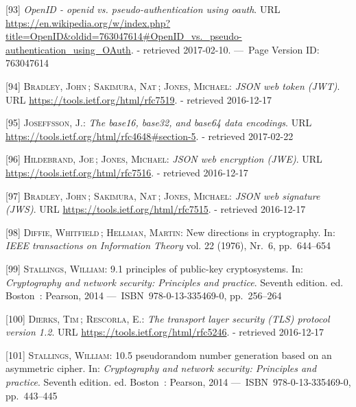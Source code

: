 \documentclass[12pt,english,a4paper,titlepage,cleardoublepage=empty,dottedtoc]{report}
\begin{document}
\hypertarget{ref-web_2017_wikipedia_openid-vs-pseudo-oauth}{}
{[}93{]} \emph{OpenID - openid vs. pseudo-authentication using oauth}.
URL
\url{https://en.wikipedia.org/w/index.php?title=OpenID\&oldid=763047614\#OpenID_vs._pseudo-authentication_using_OAuth}.
- retrieved 2017-02-10. ---~Page Version ID: 763047614

\hypertarget{ref-web_spec_json-web-token}{}
{[}94{]} \textsc{Bradley, John}\,; \textsc{Sakimura, Nat}\,;
\textsc{Jones, Michael}: \emph{JSON web token (JWT)}. URL
\url{https://tools.ietf.org/html/rfc7519}. - retrieved 2016-12-17

\hypertarget{ref-web_spec_base64url}{}
{[}95{]} \textsc{Joseffsson, J.}: \emph{The base16, base32, and base64
data encodings}. URL
\url{https://tools.ietf.org/html/rfc4648\#section-5}. - retrieved
2017-02-22

\hypertarget{ref-web_spec_json-web-encryption}{}
{[}96{]} \textsc{Hildebrand, Joe}\,; \textsc{Jones, Michael}: \emph{JSON
web encryption (JWE)}. URL \url{https://tools.ietf.org/html/rfc7516}. -
retrieved 2016-12-17

\hypertarget{ref-web_spec_json-web-signature}{}
{[}97{]} \textsc{Bradley, John}\,; \textsc{Sakimura, Nat}\,;
\textsc{Jones, Michael}: \emph{JSON web signature (JWS)}. URL
\url{https://tools.ietf.org/html/rfc7515}. - retrieved 2016-12-17

\hypertarget{ref-paper_1976_d-h-key-exchange}{}
{[}98{]} \textsc{Diffie, Whitfield}\,; \textsc{Hellman, Martin}: New
directions in cryptography. In: \emph{IEEE transactions on Information
Theory} vol. 22 (1976), Nr.~6, pp.~644--654

\hypertarget{ref-book_2014_chapter-9-1-public-key-crypto}{}
{[}99{]} \textsc{Stallings, William}: 9.1 principles of public-key
cryptosystems. In: \emph{Cryptography and network security: Principles
and practice}. Seventh edition. ed. Boston~: Pearson, 2014
---~ISBN~978-0-13-335469-0, pp.~256--264

\hypertarget{ref-web_spec_tls}{}
{[}100{]} \textsc{Dierks, Tim}\,; \textsc{Rescorla, E.}: \emph{The
transport layer security (TLS) protocol version 1.2}. URL
\url{https://tools.ietf.org/html/rfc5246}. - retrieved 2016-12-17

\hypertarget{ref-book_2014_chapter-14-5-pki}{}
{[}101{]} \textsc{Stallings, William}: 10.5 pseudorandom number
generation based on an asymmetric cipher. In: \emph{Cryptography and
network security: Principles and practice}. Seventh edition. ed.
Boston~: Pearson, 2014 ---~ISBN~978-0-13-335469-0, pp.~443--445
\end{document}
